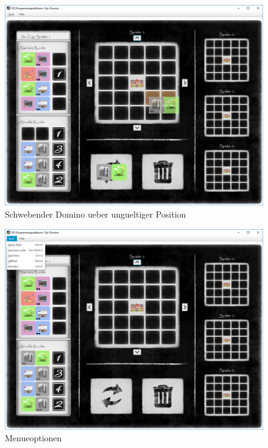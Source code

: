 \begin{figure}
	\centering
	\includegraphics{screenshots/screenshot_HovernRot}
	\caption{Schwebender Domino ueber ungueltiger Position}
	\label{fig:hovernRot}
\end{figure}


\newpage

\begin{figure}
	\centering
	\includegraphics{screenshots/screenshot_Menue}
	\caption{Menueoptionen}
	\label{fig:menueoptionen}
\end{figure}

